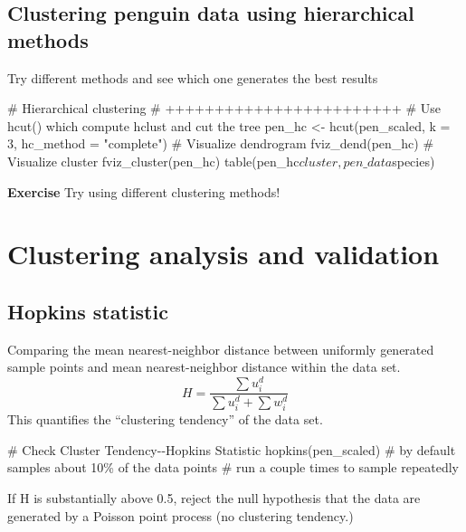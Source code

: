 \documentclass[
  letterpaper,
  DIV=11,
  numbers=noendperiod]{scrreprt}
\newenvironment{Shaded}{\begin{snugshade}}{\end{snugshade}}
\newcommand{\NormalTok}[1]{\textcolor[rgb]{0.00,0.23,0.31}{#1}}
\begin{document}
\subsection{Clustering penguin data using hierarchical
methods}\label{clustering-penguin-data-using-hierarchical-methods}

Try different methods and see which one generates the best results

\begin{Shaded}
\begin{Highlighting}[]
\NormalTok{\# Hierarchical clustering}
\NormalTok{\# ++++++++++++++++++++++++}
\NormalTok{\# Use hcut() which compute hclust and cut the tree}
\NormalTok{pen\_hc \textless{}{-} hcut(pen\_scaled, k = 3, hc\_method = "complete")}
\NormalTok{\# Visualize dendrogram}
\NormalTok{fviz\_dend(pen\_hc)}
\NormalTok{\# Visualize cluster}
\NormalTok{fviz\_cluster(pen\_hc)}
\NormalTok{table(pen\_hc$cluster, pen\_data$species)}
\end{Highlighting}
\end{Shaded}

\textbf{Exercise} Try using different clustering methods!

\section{Clustering analysis and
validation}\label{clustering-analysis-and-validation}

\subsection{Hopkins statistic}\label{hopkins-statistic}

Comparing the mean nearest-neighbor distance between uniformly generated
sample points and mean nearest-neighbor distance within the data set. \[
H = \frac{\sum u^d_i}{\sum u^d_i + \sum w^d_i}
\] This quantifies the ``clustering tendency'' of the data set.

\begin{Shaded}
\begin{Highlighting}[]
\NormalTok{\# Check Cluster Tendency{-}{-}Hopkins Statistic}
\NormalTok{hopkins(pen\_scaled) \# by default samples about 10\% of the data points}
\NormalTok{\# run a couple times to sample repeatedly}
\end{Highlighting}
\end{Shaded}

If H is substantially above 0.5, reject the null hypothesis that the
data are generated by a Poisson point process (no clustering tendency.)
\end{document}
